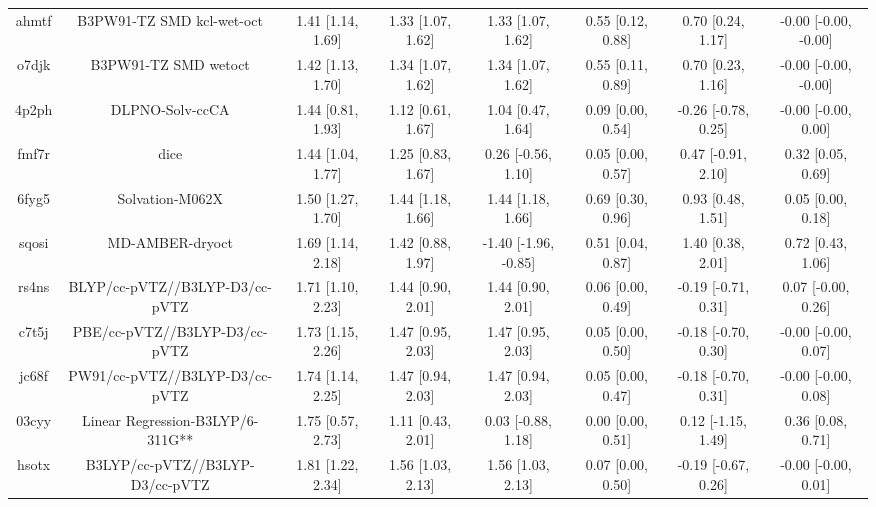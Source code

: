 \documentclass{article}
\begin{document}
\begin{center}
\begin{longtable}{|cccccccc|}
 ahmtf &                          B3PW91-TZ SMD kcl-wet-oct &  1.41 [1.14, 1.69] &  1.33 [1.07, 1.62] &     1.33 [1.07, 1.62] &  0.55 [0.12, 0.88] &    0.70 [0.24, 1.17] &  -0.00 [-0.00, -0.00] \\
 o7djk &                               B3PW91-TZ SMD wetoct &  1.42 [1.13, 1.70] &  1.34 [1.07, 1.62] &     1.34 [1.07, 1.62] &  0.55 [0.11, 0.89] &    0.70 [0.23, 1.16] &  -0.00 [-0.00, -0.00] \\
 4p2ph &                                    DLPNO-Solv-ccCA &  1.44 [0.81, 1.93] &  1.12 [0.61, 1.67] &     1.04 [0.47, 1.64] &  0.09 [0.00, 0.54] &  -0.26 [-0.78, 0.25] &   -0.00 [-0.00, 0.00] \\
 fmf7r &                                               dice &  1.44 [1.04, 1.77] &  1.25 [0.83, 1.67] &    0.26 [-0.56, 1.10] &  0.05 [0.00, 0.57] &   0.47 [-0.91, 2.10] &     0.32 [0.05, 0.69] \\
 6fyg5 &                                    Solvation-M062X &  1.50 [1.27, 1.70] &  1.44 [1.18, 1.66] &     1.44 [1.18, 1.66] &  0.69 [0.30, 0.96] &    0.93 [0.48, 1.51] &     0.05 [0.00, 0.18] \\
 sqosi &                                    MD-AMBER-dryoct &  1.69 [1.14, 2.18] &  1.42 [0.88, 1.97] &  -1.40 [-1.96, -0.85] &  0.51 [0.04, 0.87] &    1.40 [0.38, 2.01] &     0.72 [0.43, 1.06] \\
 rs4ns &                     BLYP/cc-pVTZ//B3LYP-D3/cc-pVTZ &  1.71 [1.10, 2.23] &  1.44 [0.90, 2.01] &     1.44 [0.90, 2.01] &  0.06 [0.00, 0.49] &  -0.19 [-0.71, 0.31] &    0.07 [-0.00, 0.26] \\
 c7t5j &                      PBE/cc-pVTZ//B3LYP-D3/cc-pVTZ &  1.73 [1.15, 2.26] &  1.47 [0.95, 2.03] &     1.47 [0.95, 2.03] &  0.05 [0.00, 0.50] &  -0.18 [-0.70, 0.30] &   -0.00 [-0.00, 0.07] \\
 jc68f &                     PW91/cc-pVTZ//B3LYP-D3/cc-pVTZ &  1.74 [1.14, 2.25] &  1.47 [0.94, 2.03] &     1.47 [0.94, 2.03] &  0.05 [0.00, 0.47] &  -0.18 [-0.70, 0.31] &   -0.00 [-0.00, 0.08] \\
 03cyy &                   Linear Regression-B3LYP/6-311G** &  1.75 [0.57, 2.73] &  1.11 [0.43, 2.01] &    0.03 [-0.88, 1.18] &  0.00 [0.00, 0.51] &   0.12 [-1.15, 1.49] &     0.36 [0.08, 0.71] \\
 hsotx &                    B3LYP/cc-pVTZ//B3LYP-D3/cc-pVTZ &  1.81 [1.22, 2.34] &  1.56 [1.03, 2.13] &     1.56 [1.03, 2.13] &  0.07 [0.00, 0.50] &  -0.19 [-0.67, 0.26] &   -0.00 [-0.00, 0.01] \\

\end{longtable}
\end{center}
\end{document}
